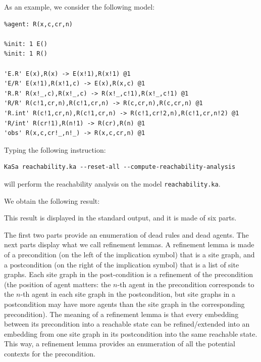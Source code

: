 \documentclass[11pt]{book}
\begin{document}
As an example, we consider the following model:
\begin{lstlisting}[language=kappa]
%agent: E(x)
%agent: R(x,c,cr,n)

%init: 1 E()
%init: 1 R()

'E.R' E(x),R(x) -> E(x!1),R(x!1) @1
'E/R' E(x!1),R(x!1,c) -> E(x),R(x,c) @1
'R.R' R(x!_,c),R(x!_,c) -> R(x!_,c!1),R(x!_,c!1) @1
'R/R' R(c!1,cr,n),R(c!1,cr,n) -> R(c,cr,n),R(c,cr,n) @1
'R.int' R(c!1,cr,n),R(c!1,cr,n) -> R(c!1,cr!2,n),R(c!1,cr,n!2) @1
'R/int' R(cr!1),R(n!1) -> R(cr),R(n) @1
'obs' R(x,c,cr!_,n!_) -> R(x,c,cr,n) @1
\end{lstlisting}

Typing the following instruction:
\begin{verbatim}
KaSa reachability.ka --reset-all --compute-reachability-analysis
\end{verbatim}

will perform the reachability analysis on the model \texttt{reachability.ka}.

We obtain the following result:




This result is displayed in the standard output, and it is made of six parts.

The first two parts provide an enumeration of dead rules and dead agents.
The next parts display what we call refinement lemmas.
A refinement lemma is made of a precondition (on the left of the implication symbol) that is a site graph, and a postcondition (on the right of the implication symbol) that is a list of site graphs. Each site graph in the post-condition is a refinement of the precondition (the position of agent matters: the $n$-th agent in the precondition corresponds to the $n$-th agent in each site graph in the postcondition, but site graphs in a postcondition may have more agents than the site graph in the corresponding precondition).
The meaning of a refinement lemma is that every embedding between its precondition into a reachable state can be refined/extended into
an embedding from one site graph in its postcondition into the same reachable state. This way, a refinement lemma provides an enumeration of all the potential contexts for the precondition.
\end{document}
